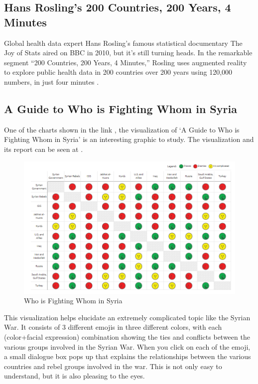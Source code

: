 \documentclass[]{book}
\theoremstyle{definition}
\theoremstyle{definition}
\theoremstyle{definition}
\theoremstyle{remark}
\begin{document}
\subsection{Hans Rosling's 200 Countries, 200 Years, 4
Minutes}\label{hans-roslings-200-countries-200-years-4-minutes}

Global health data expert Hans Rosling's famous statistical documentary
The Joy of Stats aired on BBC in 2010, but it's still turning heads. In
the remarkable segment ``200 Countries, 200 Years, 4 Minutes,'' Rosling
uses augmented reality to explore public health data in 200 countries
over 200 years using 120,000 numbers, in just four minutes
\citep{hans_rosling}.

\subsection{A Guide to Who is Fighting Whom in
Syria}\label{a-guide-to-who-is-fighting-whom-in-syria-1}

One of the charts shown in the link \citep{int_viz_1}, the visualization
of `A Guide to Who is Fighting Whom in Syria' is an interesting graphic
to study. The visualization and its report can be seen at
\citep{syria_chart}.

\begin{figure}
\centering
\includegraphics{images/img_syria_summary.PNG}
\caption{Who is Fighting Whom in Syria}
\end{figure}

This visualization helps elucidate an extremely complicated topic like
the Syrian War. It consists of 3 different emojis in three different
colors, with each (color+facial expression) combination showing the ties
and conflicts between the various groups involved in the Syrian War.
When you click on each of the emoji, a small dialogue box pops up that
explains the relationships between the various countries and rebel
groups involved in the war. This is not only easy to understand, but it
is also pleasing to the eyes.
\end{document}
